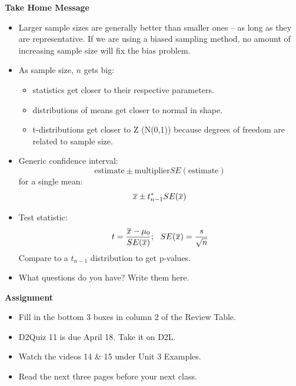 \begin{center}
  {\large\bf Take Home Message}
\end{center}
 
\begin{itemize}
\item Larger sample sizes are generally better than smaller ones --
   as long as they are representative.  If we are using a biased
   sampling method, no amount of increasing sample size will fix the
   bias problem.
 \item As sample size, $n$ gets big:
   \begin{itemize}
   \item statistics get closer to their respective parameters.
   \item distributions of means get closer to normal in shape.
   \item t-distributions get closer to Z (N(0,1)) because degrees of
     freedom are related to sample size.
   \end{itemize}
 \item Generic confidence interval:
  $$ \mbox{estimate} \pm \mbox{multiplier} SE(\mbox{estimate})$$
    for a single mean:
  $$ \overline{x} \pm t^*_{n-1} SE(\overline{x})$$
  \item Test statistic:
   $$ t = \frac{\overline{x} - \mu_0}{SE(\overline{x})};\ \ SE(\overline{x}) =
   \frac{s}{\sqrt{n}}$$
    Compare to a $t_{n-1}$ distribution to get p-values.

 \item What questions do you have?  Write them here.\vfill

\end{itemize}




\begin{center}
  {\large\bf Assignment}
\end{center}

\begin{itemize}
\item Fill in the bottom 3 boxes in column 2 of the Review Table. 
\item D2Quiz 11 is due April 18.  Take it on D2L.
\item Watch the videos 14 \& 15 under Unit 3 Examples.
\item Read the next three pages before your next class.
\end{itemize}
